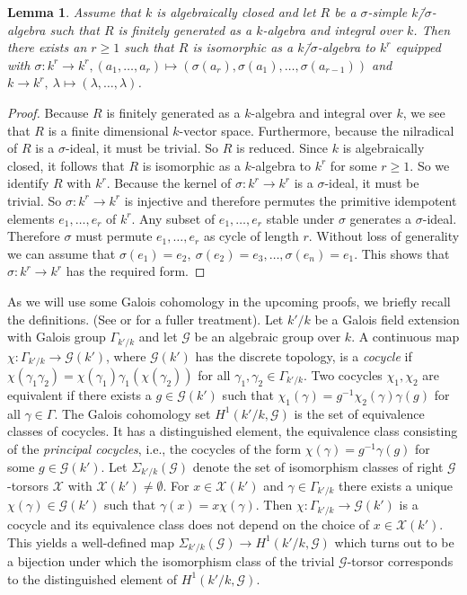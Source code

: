 \documentclass[oneside,reqno]{amsart}
\newtheorem{lemma}[theo]{Lemma}
\theoremstyle{definition}
\newcommand{\G}{\mathcal{G}}
\newcommand{\X}{\mathcal{X}}
\newcommand{\s}{\sigma}
\newcommand{\ks}{$k$\=/$\s$}
\begin{document}
\begin{lemma} \label{lemma: structure of R}
	Assume that $k$ is algebraically closed and let $R$ be a $\s$-simple \ks-algebra such that $R$ is finitely generated as a $k$-algebra and integral over $k$. Then there exists an $r\geq 1$ such that $R$ is 
	isomorphic as a \ks-algebra to $k^r$ equipped with $\s\colon k^r\to k^r, (a_1,\dots,a_r)\mapsto (\s(a_r),\s(a_1),\dots,\s(a_{r-1}))$ and $k\to k^r,\ \lambda\mapsto (\lambda,\ldots,\lambda)$.
\end{lemma}
\begin{proof}
	Because $R$ is finitely generated as a $k$-algebra and integral over $k$, we see that $R$ is a finite dimensional $k$-vector space. Furthermore, because the nilradical of $R$ is a $\s$-ideal, it must be trivial. So $R$ is reduced. Since $k$ is algebraically closed, it follows that $R$ is isomorphic as a $k$-algebra to $k^r$ for some $r\geq 1$. So we identify $R$ with $k^r$. Because the kernel of $\s\colon k^r\to k^r$ is a $\s$-ideal, it must be trivial. So $\s\colon k^r\to k^r$ is injective and therefore permutes the primitive idempotent elements $e_1,\ldots,e_r$ of $k^r$. Any subset of $e_1,\ldots,e_r$ stable under $\s$ generates a $\s$-ideal. Therefore $\s$ must permute $e_1,\ldots,e_r$ as cycle of length $r$. Without loss of generality we can assume that $\s(e_1)=e_2,\ \s(e_2)=e_3,\ldots,\s(e_n)=e_1$. This shows that $\s\colon k^r\to k^r$ has the required form.
\end{proof}	


As we will use some Galois cohomology in the upcoming proofs, we briefly recall the definitions. (See \cite[Section 3, k]{Milne:AlgebraicGroups} or \cite{Serre:GaloisCohomology} for a fuller treatment). Let $k'/k$ be a Galois field extension with Galois group $\Gamma_{k'/k}$ and let $\G$ be an algebraic group over $k$.  A continuous map $\chi\colon \Gamma_{k'/k}\to \G(k')$, where $\G(k')$ has the discrete topology, is a \emph{cocycle} if $\chi(\gamma_1\gamma_2)=\chi(\gamma_1)\gamma_1(\chi(\gamma_2))$ for all $\gamma_1,\gamma_2\in \Gamma_{k'/k}$. Two cocycles $\chi_1,\chi_2$ are equivalent if there exists a $g\in\G(k')$ such that $\chi_1(\gamma)=g^{-1}\chi_2(\gamma)\gamma(g)$ for all $\gamma\in\Gamma$.
The Galois cohomology set $H^1(k'/k,\G)$ is the set of equivalence classes of cocycles. It has a distinguished element, the equivalence class consisting of the \emph{principal cocycles}, i.e., the cocycles of the form $\chi(\gamma)=g^{-1}\gamma(g)$ for some $g\in\G(k')$. Let $\Sigma_{k'/k}(\G)$ denote the set of isomorphism classes of right $\G$-torsors $\X$ with $\X(k')\neq\emptyset$. For $x\in \X(k')$ and $\gamma\in \Gamma_{k'/k}$ there exists a unique $\chi(\gamma)\in\G(k')$ such that $\gamma(x)=x\chi(\gamma)$. Then $\chi\colon\Gamma_{k'/k}\to\G(k')$ is a cocycle and its equivalence class does not depend on the choice of $x\in \X(k')$. This yields a well-defined map $\Sigma_{k'/k}(\G)\to H^1(k'/k,\G)$ which turns out to be a bijection under which the isomorphism class of the trivial $\G$-torsor corresponds to the distinguished element of $H^1(k'/k,\G)$. 
\end{document}
